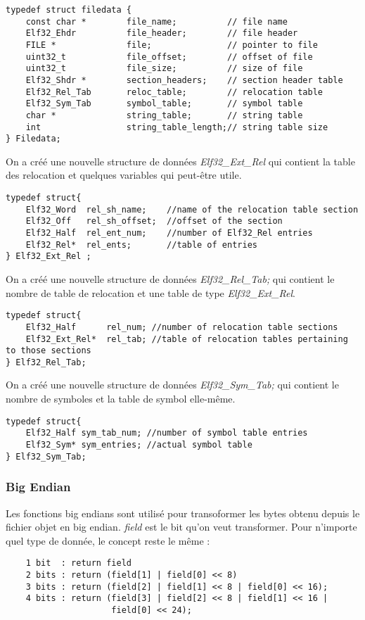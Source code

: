 \documentclass[a4paper]{article} %
\begin{document}
\begin{lstlisting}
typedef struct filedata {
    const char *        file_name;          // file name
    Elf32_Ehdr          file_header;        // file header
    FILE *              file;               // pointer to file
    uint32_t            file_offset;        // offset of file
    uint32_t            file_size;          // size of file
    Elf32_Shdr *        section_headers;    // section header table
    Elf32_Rel_Tab       reloc_table;        // relocation table
    Elf32_Sym_Tab       symbol_table;       // symbol table
    char *              string_table;       // string table
    int                 string_table_length;// string table size
} Filedata;
\end{lstlisting}
\bigbreak

On a créé une nouvelle structure de données \textit{Elf32\_Ext\_Rel} qui contient 
la table des relocation et quelques variables qui peut-être utile. 
\begin{lstlisting}
typedef struct{
    Elf32_Word  rel_sh_name;    //name of the relocation table section
    Elf32_Off   rel_sh_offset;  //offset of the section
    Elf32_Half  rel_ent_num;    //number of Elf32_Rel entries
    Elf32_Rel*  rel_ents;       //table of entries
} Elf32_Ext_Rel ;
\end{lstlisting}
\bigbreak

On a créé une nouvelle structure de données \textit{Elf32\_Rel\_Tab;} qui contient 
le nombre de table de relocation et une table de type \textit{Elf32\_Ext\_Rel}.
\begin{lstlisting}
typedef struct{
    Elf32_Half      rel_num; //number of relocation table sections
    Elf32_Ext_Rel*  rel_tab; //table of relocation tables pertaining to those sections
} Elf32_Rel_Tab;
\end{lstlisting}
\bigbreak

On a créé une nouvelle structure de données \textit{Elf32\_Sym\_Tab;} qui contient 
le nombre de symboles et la table de symbol elle-même. 
\begin{lstlisting}
typedef struct{
    Elf32_Half sym_tab_num; //number of symbol table entries
    Elf32_Sym* sym_entries; //actual symbol table
} Elf32_Sym_Tab;
\end{lstlisting}

\subsubsection*{Big Endian}
\label{sec:endian}
Les fonctions big endians sont utilisé pour transoformer les bytes obtenu depuis 
le fichier objet en big endian. \textit{field} est le bit qu'on veut transformer. 
Pour n'importe quel type de donnée, le concept reste le même :
\begin{lstlisting}
    1 bit  : return field 
    2 bits : return (field[1] | field[0] << 8)
    3 bits : return (field[2] | field[1] << 8 | field[0] << 16);
    4 bits : return (field[3] | field[2] << 8 | field[1] << 16 | 
                     field[0] << 24);
\end{lstlisting}
\end{document}
